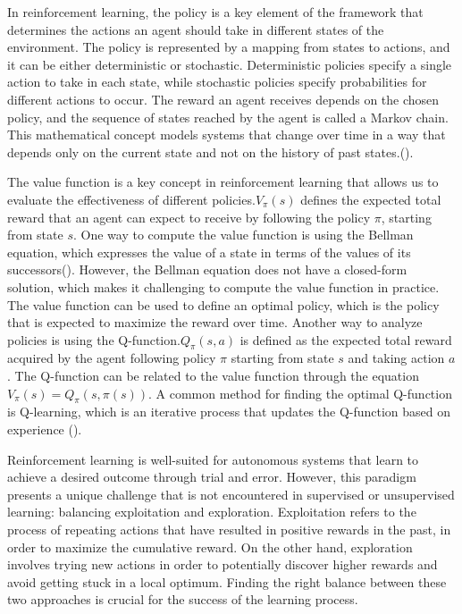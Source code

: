 \vspace{5mm}

In reinforcement learning, the policy is a key element of the framework that determines the actions an agent should take in different states of the environment. The policy is represented by a mapping from states to actions, and it can be either deterministic or stochastic. Deterministic policies specify a single action to take in each state, while stochastic policies specify probabilities for different actions to occur. The reward an agent receives depends on the chosen policy, and the sequence of states reached by the agent is called a Markov chain. This mathematical concept models systems that change over time in a way that depends only on the current state and not on the history of past states.(\cite{sutton_reinforcement_2018}).

The value function is a key concept in reinforcement learning that allows us to evaluate the effectiveness of different policies.$V_{\pi}(s)$ defines the expected total reward that an agent can expect to receive by following the policy $\pi$, starting from state $s$. One way to compute the value function is using the Bellman equation, which expresses the value of a state in terms of the values of its successors(\cite{barron_bellman_1989}). However, the Bellman equation does not have a closed-form solution, which makes it challenging to compute the value function in practice.
The value function can be used to define an optimal policy, which is the policy that is expected to maximize the reward over time. Another way to analyze policies is using the Q-function.$Q_{\pi}(s, a)$ is defined as the expected total reward acquired by the agent following policy $\pi$ starting from state $s$ and taking action $a$. The Q-function can be related to the value function through the equation $V_{\pi}(s) = Q_{\pi}(s, \pi(s))$. A common method for finding the optimal Q-function is Q-learning, which is an iterative process that updates the Q-function based on experience (\cite{watkins_q-learning_1992}). 

\vspace{5mm}

Reinforcement learning is well-suited for autonomous systems that learn to achieve a desired outcome through trial and error. However, this paradigm presents a unique challenge that is not encountered in supervised or unsupervised learning: balancing exploitation and exploration. Exploitation refers to the process of repeating actions that have resulted in positive rewards in the past, in order to maximize the cumulative reward. On the other hand, exploration involves trying new actions in order to potentially discover higher rewards and avoid getting stuck in a local optimum. Finding the right balance between these two approaches is crucial for the success of the learning process.

